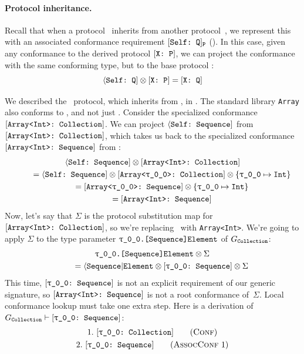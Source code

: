 \documentclass[../generics]{subfiles}
\begin{document}
\paragraph{Protocol inheritance.}
Recall that when a protocol \tP\ inherits from another protocol~\tQ, we represent this with an associated conformance requirement $[\texttt{Self:~Q}]_{\texttt{P}}$ (). In this case, given any conformance to the derived protocol $[\texttt{X:~P}]$, we can project the conformance with the same conforming type, but to the base protocol \tQ:
\[
\langle\texttt{Self:~Q}] \otimes [\texttt{X:~P}] = [\texttt{X:~Q}]
\]

\begin{example}\label{protocol inherit assoc conf}
We described the \tCollection\ protocol, which inherits from \tSequence, in . The standard library \texttt{Array} also conforms to \tCollection, and not just \tSequence. Consider the specialized conformance $[\texttt{Array<Int>:~Collection}]$. We can project $\langle\texttt{Self:~Sequence}]$ from $[\texttt{Array<Int>:~Collection}]$, which takes us back to the specialized conformance $[\texttt{Array<Int>:~Sequence}]$ from :
\begin{gather*}
\SelfSequence \otimes \ArrayIntCollection \\
\qquad {} = \SelfSequence \otimes \ArrayCollection \otimes \SubMapInt\\
\qquad {} = \ArraySequence \otimes \SubMapInt\\
\qquad {} = \ArrayIntSequence
\end{gather*}
Now, let's say that $\Sigma$ is the protocol substitution map for $[\texttt{Array<Int>:~Collection}]$, so we're replacing \rT\ with \texttt{Array<Int>}. We're going to apply $\Sigma$ to the type parameter $\texttt{\rT.[Sequence]Element}$ of $G_{\texttt{Collection}}$:
\begin{gather*}
\texttt{\rT.[Sequence]Element} \otimes \Sigma \\
\qquad {} = \AElement \otimes \rTSequence \otimes \Sigma
\end{gather*}
This time, $\rTSequence$ is not an explicit requirement of our generic signature, so $[\texttt{Array<Int>:~Sequence}]$ is not a root conformance of~$\Sigma$. Local conformance lookup must take one extra step. Here is a derivation of $G_\tCollection\vdash\rTSequence$:
\begin{gather*}
\ConfStep{\rT}{Collection}{1}\\
\AssocConfStep{1}{\rT}{Sequence}{2}
\end{gather*}

\end{example}
\end{document}
